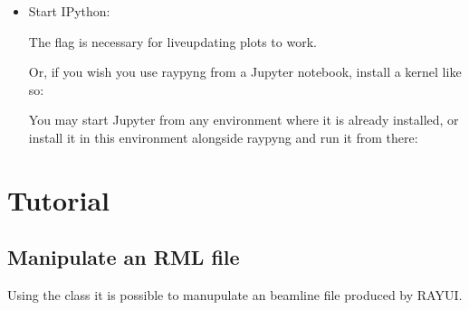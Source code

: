 \documentclass[letterpaper,10pt,english]{sphinxmanual}
\begin{document}
\begin{itemize}
\item {} 
\sphinxAtStartPar
Start IPython:

\begin{sphinxVerbatim}[commandchars=\\\{\}]
 
\end{sphinxVerbatim}

\sphinxAtStartPar
The flag  is necessary for live\sphinxhyphen{}updating plots to work.

\sphinxAtStartPar
Or, if you wish you use raypyng from a Jupyter notebook, install a kernel like
so:

\begin{sphinxVerbatim}[commandchars=\\\{\}]
      
\end{sphinxVerbatim}

\sphinxAtStartPar
You may start Jupyter from any environment where it is already installed, or
install it in this environment alongside raypyng and run it from there:

\begin{sphinxVerbatim}[commandchars=\\\{\}]
  
 
\end{sphinxVerbatim}

\end{itemize}

\sphinxstepscope


\chapter{Tutorial}
\label{\detokenize{tutorial:tutorial}}\label{\detokenize{tutorial::doc}}

\section{Manipulate an RML file}
\label{\detokenize{tutorial:manipulate-an-rml-file}}
\sphinxAtStartPar
Using the  class it is possible to manupulate an beamline file produced by RAY\sphinxhyphen{}UI.
\end{document}
